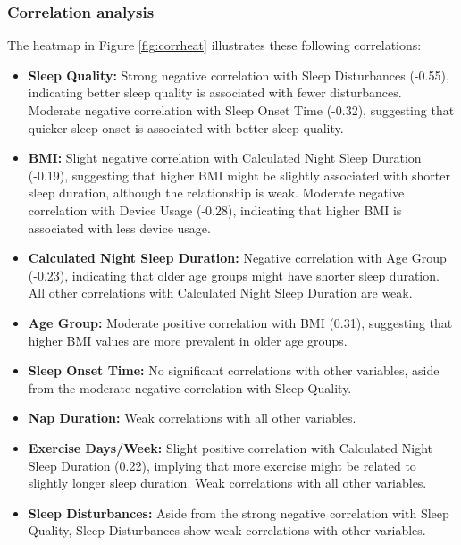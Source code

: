 \documentclass[conference]{IEEEtran}
\begin{document}
    \subsubsection*{Correlation analysis}
    The heatmap in Figure \ref{fig:corrheat} illustrates these following correlations:
    \begin{itemize}
        
\item \textbf{Sleep Quality:} Strong negative correlation with Sleep Disturbances (-0.55), indicating better sleep quality is associated with fewer disturbances.
Moderate negative correlation with Sleep Onset Time (-0.32), suggesting that quicker sleep onset is associated with better sleep quality.

\item \textbf{BMI:} Slight negative correlation with Calculated Night Sleep Duration (-0.19), suggesting that higher BMI might be slightly associated with shorter sleep duration, although the relationship is weak.
Moderate negative correlation with Device Usage (-0.28), indicating that higher BMI is associated with less device usage.

\item \textbf{Calculated Night Sleep Duration:} Negative correlation with Age Group (-0.23), indicating that older age groups might have shorter sleep duration.
All other correlations with Calculated Night Sleep Duration are weak.

\item \textbf{Age Group:} Moderate positive correlation with BMI (0.31), suggesting that higher BMI values are more prevalent in older age groups.

\item \textbf{Sleep Onset Time:} No significant correlations with other variables, aside from the moderate negative correlation with Sleep Quality.

\item \textbf{Nap Duration:} Weak correlations with all other variables.

\item \textbf{Exercise Days/Week:} Slight positive correlation with Calculated Night Sleep Duration (0.22), implying that more exercise might be related to slightly longer sleep duration.
Weak correlations with all other variables.

\item \textbf{Sleep Disturbances:} Aside from the strong negative correlation with Sleep Quality, Sleep Disturbances show weak correlations with other variables.


\end{itemize}
\end{document}
